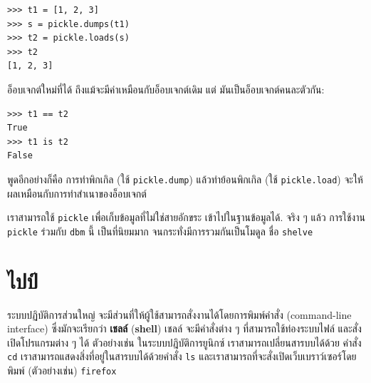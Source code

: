 \begin{verbatim}
>>> t1 = [1, 2, 3]
>>> s = pickle.dumps(t1)
>>> t2 = pickle.loads(s)
>>> t2
[1, 2, 3]
\end{verbatim}
%
%
อ็อบเจกต์ใหม่ที่ได้ ถึงแม้จะมีค่าเหมือนกับอ็อบเจกต์เดิม
แต่ มันเป็นอ็อบเจกต์คนละตัวกัน:

\begin{verbatim}
>>> t1 == t2
True
>>> t1 is t2
False
\end{verbatim}
%
%
พูดอีกอย่างก็คือ การทำพิกเกิล (ใช้ \texttt{pickle.dump}) แล้วทำย้อนพิกเกิล (ใช้ \texttt{pickle.load}) จะให้ผลเหมือนกับการทำสำเนาของอ็อบเจกต์


เราสามารถใช้ \texttt{pickle} เพื่อเก็บข้อมูลที่ไม่ใช่สายอักขระ เข้าไปในฐานข้อมูลได้.
จริง ๆ แล้ว การใช้งาน \texttt{pickle} ร่วมกับ \texttt{dbm} นี้ เป็นที่นิยมมาก จนกระทั่งมีการรวมกันเป็นโมดูล ชื่อ \texttt{shelve}

\section{ไปป์}


ระบบปฏิบัติการส่วนใหญ่ จะมีส่วนที่ให้ผู้ใช้สามารถสั่งงานได้โดยการพิมพ์คำสั่ง (command-line interface) ซึ่งมักจะเรียกว่า \textbf{เชลล์} (\textbf{shell})
เชลล์ จะมีคำสั่งต่าง ๆ ที่สามารถใช้ท่องระบบไฟล์ และสั่งเปิดโปรแกรมต่าง ๆ ได้
ตัวอย่างเช่น ในระบบปฎิบัติการยูนิกซ์ 
เราสามารถเปลี่ยนสารบบได้ด้วย คำสั่ง \texttt{cd}
เราสามารถแสดงสิ่งที่อยู่ในสารบบได้ด้วยคำสั่ง \texttt{ls}
และเราสามารถที่จะสั่งเปิดเว็บเบราว์เซอร์โดยพิมพ์ (ตัวอย่างเช่น) \texttt{firefox}


